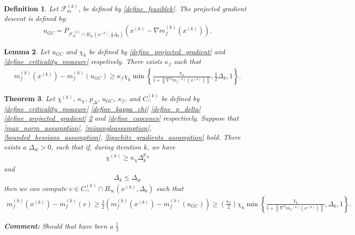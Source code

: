 \documentclass{article}
\newenvironment{comment}
  {\par\medskip
   \color{red}%
   \begin{framed}
   \textbf{Comment: }\ignorespaces}
 {\end{framed}
  \medskip}
\newtheorem{theorem}{Theorem}[section]
\newtheorem{definition}[theorem]{Definition}
\newtheorem{lemma}[theorem]{Lemma}
\theoremstyle{case}
\numberwithin{theorem}{subsection}
\newcommand{\capcones}{{C^{(k)}_{\cap}}}
\newcommand{\chik}{{\chi^{(k)}}}
\newcommand{\dk}{\Delta_k}
\newcommand{\dsr}{{\Delta_{\textrm{sr}}}}
\newcommand{\feasiblek}{{\mathcal F_m^{(k)}}}
\newcommand{\gk}{{\nabla m_f^{(k)}\left(\xk\right)}}
\newcommand{\mfk}{{{m}_f}^{(k)}}
\newcommand{\tr}{{ B_{\infty}\left(\xk, \dk\right) }}
\newcommand{\xk}{x^{(k)}}
\begin{document}
\begin{definition}
Let $\feasiblek$, be defined by \cref{define_feasiblek}.
The projected gradient descent is defined by:
\begin{align}
u_{GC} = P_{\feasiblek\cap B_{\infty}\left(\xk, \frac 1 2 \dk\right)}\left(\xk-\gk\right) \label{define_projected_gradient}.
\end{align}
\end{definition}

\begin{lemma}
\label{sufficient_reduction_of_projected_gradient}
Let 
$u_{GC}$ and $\chi_k$
be defined by
\cref{define_projected_gradient} and \cref{define_criticality_measure}
respetively.
There exists $\kappa_{f}$ such that
\begin{align*}
m_f^{(k)}\left(\xk\right) - m_f^{(k)}\left(u_{GC}\right) \ge \kappa_f\chi_k \min\left\{ \frac{\chi_k}{1+\left\|\nabla^2 \mfk(\xk)\right\|}, \frac 1 2 \dk, 1 \right\}.
\end{align*}
\end{lemma}




\begin{theorem}
\label{sufficient_reduction_theorem}
Let 
$\chik$,
$\kappa_{\chi}$,
$p_{\Delta}$,
$u_{GC}$,
$\kappa_f$,
and $\capcones$
be defined by
\cref{define_criticality_measure}
\cref{define_kappa_chi}
\cref{define_p_delta}
\cref{define_projected_gradient}
\cref{sufficient_reduction_of_projected_gradient}
and \cref{define_capcones}
respectively.
Suppose that
\cref{max_norm_assumption},
\cref{minangleassumption},
\cref{bounded_hessians_assumption},
\cref{lipschitz_gradients_assumption}
hold.
There exists a $\dsr > 0$, such that if, during iteration $k$, we have
\begin{align}
\chik \ge \kappa_{\chi} \dk^{p_{\Delta}} \label{sr_chi_big_enough}
\end{align}
and
\begin{align}
\dk \le \dsr \label{sr_delta_small_enough}
\end{align}
then we can compute $v \in \capcones \cap \tr$ such that
\begin{align*}
m_f^{(k)}(\xk) - m_f^{(k)}(v) \ge \frac 1 2 \left(m_f^{(k)}(\xk) - m_f^{(k)}(u_{GC})\right) \ge \left(\frac{\kappa_f}{2} \right)\chi_k \min\left\{ \frac{\chi_k}{1+\left\|\nabla^2 \mfk(\xk)\right\|}, \dk, 1 \right\}.
\end{align*}

\begin{comment}
Should that have been a $\frac 1 2$
\end{comment}

\end{theorem}
\end{document}
